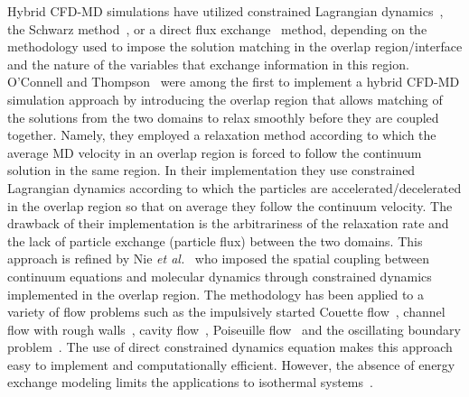 \documentclass[preprint,12pt]{elsarticle}
\begin{document}
Hybrid CFD-MD simulations have utilized constrained Lagrangian dynamics~\cite{Thompson,Nie,Nie_cavity,Cui,Wang,Yen,Liu}, the Schwarz method~\cite{Hadjicon1,Hadjicon2,Hadjicon3,Werder,Kotsalis}, or a direct flux exchange~\cite{Flekkoy,Wagner,Delgado1,USHER,Time_Mechanism,Giupponi} method, depending on the methodology used to impose the solution matching in the overlap region/interface and the nature of the variables that exchange information in this region. 
O'Connell and Thompson~\cite{Thompson} 
were among the first to implement a hybrid CFD-MD simulation approach by introducing the overlap region that allows matching of the solutions from the two domains to relax smoothly before they are coupled together. Namely, they employed a relaxation method according to which the average MD velocity in an overlap region is forced to follow the continuum solution in the same region. In their implementation they use constrained Lagrangian dynamics according to which the particles are accelerated/decelerated in the overlap region so that on average they follow the continuum velocity. The drawback of their implementation is the arbitrariness of the relaxation rate and the lack of particle exchange (particle flux) between the two domains. 
This approach is refined by Nie {\it{et al.}}~\cite{Nie} 
who imposed the spatial coupling between continuum equations and molecular dynamics through constrained dynamics implemented in the overlap region. %
The methodology has been applied to a variety of flow problems such as the impulsively started Couette flow~\cite{Thompson}, channel flow with rough walls~\cite{Nie}, cavity flow~\cite{Nie_cavity}, Poiseuille flow~\cite{Yen} and the oscillating boundary problem~\cite{Wang,Liu}. The use of direct constrained dynamics equation makes this approach easy to implement and computationally efficient. However, the absence of energy exchange modeling limits the applications to isothermal systems~\cite{Flekkoy}.
\end{document}
